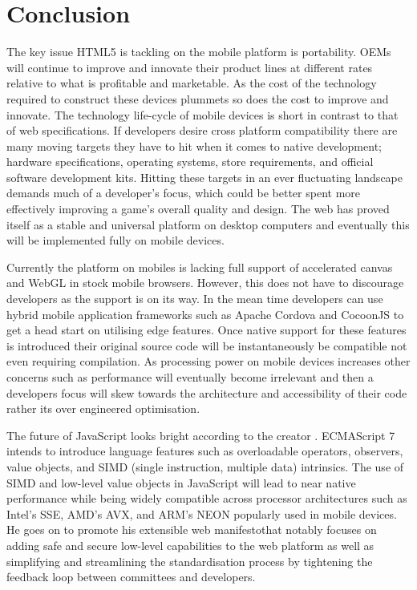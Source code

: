 \documentclass[final]{cmpreport}
\begin{document}
\section{Conclusion}
The key issue HTML5 is tackling on the mobile platform is portability. OEMs will continue to improve and innovate their product lines at different rates relative to what is profitable and marketable. As the cost of the technology required to construct these devices plummets so does the cost to improve and innovate. The technology life-cycle of mobile devices is short in contrast to that of web specifications. If developers desire cross platform compatibility there are many moving targets they have to hit when it comes to native development; hardware specifications, operating systems, store requirements, and official software development kits. Hitting these targets in an ever fluctuating landscape demands much of a developer's focus, which could be better spent more effectively improving a game's overall quality and design. The web has proved itself as a stable and universal platform on desktop computers and eventually this will be implemented fully on mobile devices.

Currently the platform on mobiles is lacking full support of accelerated canvas and WebGL in stock mobile browsers. However, this does not have to discourage developers as the support is on its way. In the mean time developers can use hybrid mobile application frameworks such as Apache Cordova and CocoonJS to get a head start on utilising edge features. Once native support for these features is introduced their original source code will be instantaneously be compatible not even requiring compilation. As processing power on mobile devices increases other concerns such as performance will eventually become irrelevant and then a developers focus will skew towards the architecture and accessibility of their code rather its over engineered optimisation.

The future of JavaScript looks bright according to the creator \citet{Eich}. ECMAScript 7 intends to introduce language features such as overloadable operators, observers, value objects, and SIMD (single instruction, multiple data) intrinsics. The use of SIMD and low-level value objects in JavaScript will lead to near native performance while being widely compatible across processor architectures such as Intel's SSE, AMD's AVX, and ARM's NEON popularly used in mobile devices. He goes on to promote his extensible web manifesto\footnotemark that notably focuses on adding safe and secure low-level capabilities to the web platform as well as simplifying and streamlining the standardisation process by tightening the feedback loop between committees and developers.
\end{document}
